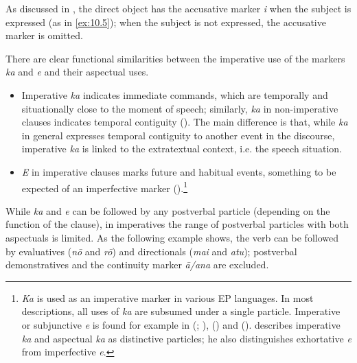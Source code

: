 As discussed in , the direct object has the accusative marker \textit{i} when the subject is expressed (as in \ref{ex:10.5}); when the subject is not expressed, the accusative marker is omitted.

There are clear functional similarities between the imperative use of the markers \textit{ka} and \textit{e} and their aspectual uses. 

\begin{itemize}
\item 
Imperative \textit{ka} indicates immediate commands, which are temporally and situationally close to the moment of speech; similarly, \textit{ka} in non-imperative clauses indicates temporal contiguity (). The main difference is that, while \textit{ka} in general expresses temporal contiguity to another event in the discourse, imperative \textit{ka} is linked to the extratextual context, i.e. the speech situation. 

\item 
\textit{E} in imperative clauses marks future and habitual events, something to be expected of an imperfective marker ().\footnote{\label{fn:484}\textit{Ka} is used as an imperative marker in various EP languages. In most descriptions, all uses of \textit{ka} are subsumed under a single particle. Imperative or subjunctive \textit{e} is found for example in  (\citealt[403]{Waite1990}; \citealt[30]{Bauer1993}),  (\citealt[28]{LazardPeltzer2000}) and  (\citealt[61]{ElbertPukui1979}). \citet{WeberR2003} describes imperative \textit{ka} and aspectual \textit{ka} as distinctive particles; he also distinguishes exhortative \textit{e} from imperfective \textit{e}.} 

\end{itemize}

While \textit{ka} and \textit{e} can be followed by any postverbal particle (depending on the function of the clause), in imperatives the range of postverbal particles with both aspectuals is limited. As the following example shows, the verb can be followed by evaluatives (\textit{nō} and \textit{rō}) and directionals (\textit{mai} and \textit{atu}); postverbal demonstratives and the continuity marker \textit{{\ꞌ}ā/{\ꞌ}ana} are excluded.

